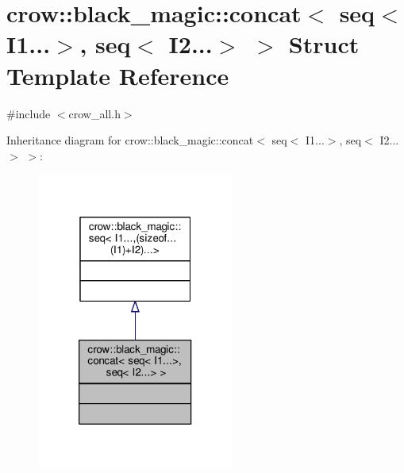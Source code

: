 \hypertarget{structcrow_1_1black__magic_1_1concat_3_01seq_3_01_i1_8_8_8_4_00_01seq_3_01_i2_8_8_8_4_01_4}{\section{crow\-:\-:black\-\_\-magic\-:\-:concat$<$ seq$<$ I1...$>$, seq$<$ I2...$>$ $>$ Struct Template Reference}
\label{structcrow_1_1black__magic_1_1concat_3_01seq_3_01_i1_8_8_8_4_00_01seq_3_01_i2_8_8_8_4_01_4}
}


{\ttfamily \#include $<$crow\-\_\-all.\-h$>$}



Inheritance diagram for crow\-:\-:black\-\_\-magic\-:\-:concat$<$ seq$<$ I1...$>$, seq$<$ I2...$>$ $>$\-:
\nopagebreak
\begin{figure}[H]
\begin{center}
\leavevmode
\includegraphics[width=184pt]{structcrow_1_1black__magic_1_1concat_3_01seq_3_01_i1_8_8_8_4_00_01seq_3_01_i2_8_8_8_4_01_4__inherit__graph}
\end{center}
\end{figure}


